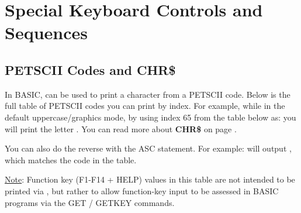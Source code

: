 \chapter{Special Keyboard Controls and Sequences}


\section{PETSCII Codes and CHR\$}

\label{appendix:asciicodes}

In BASIC,   can be used to print a character from a PETSCII code.
Below is the full table of PETSCII codes you can print by index.  For example, while in the default uppercase/graphics mode, by
using index 65 from the table below as:  you will
print the letter . You can read more about {\bf CHR\$} on page \pageref{chrcommand}.

You can also do the reverse with the ASC statement.  For example:
 will output , which matches the
code in the table.

\underline{Note}: Function key (F1-F14 + HELP) values in this table are not intended to be printed via ,
but rather to allow function-key input to be assessed in BASIC programs via the GET / GETKEY commands.


